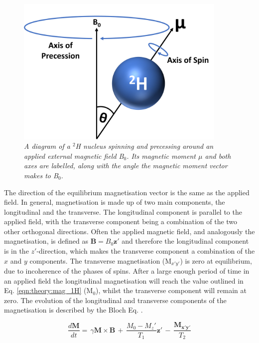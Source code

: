 \begin{figure}
    \centering
    \includegraphics[width=0.9\textwidth]{Figures/Theory/Moment.png}
    \caption{\textit{A diagram of a $^2$H nucleus spinning and precessing around an applied external magnetic field B$_0$. Its magnetic moment $\mu$ and both axes are labelled, along with the angle the magnetic moment vector makes to B$_0$.}}
    \label{fig:theory:moment}
\end{figure}

The direction of the equilibrium magnetisation vector is the same as the applied field. In general, magnetisation is made up of two main components, the longitudinal and the transverse. The longitudinal component is parallel to the applied field, with the transverse component being a combination of the two other orthogonal directions. Often the applied magnetic field, and analogously the magnetisation, is defined as $\mathbf{B}=B_0\mathbf{z'}$ and therefore the longitudinal component is in the $z'$-direction, which makes the transverse component a combination of the $x$ and $y$ components. The transverse magnetisation (M$_{x'y'}$) is zero at equilibrium, due to incoherence of the phases of spins. After a large enough period of time in an applied field the longitudinal magnetisation will reach the value outlined in Eq. \ref{eqn:theory:mag_1H} (M$_0$), whilst the transverse component will remain at zero. The evolution of the longitudinal and transverse components of the magnetisation is described by the Bloch Eq. \cite{Bloch1946NuclearInduction}.

\begin{equation}
    \frac{d\mathbf{M}}{dt} = \, \gamma\mathbf{M} \times \mathbf{B} \, + \, \frac{M_0-M_z'}{T_1}\mathbf{z'} \, - \, \frac{\mathbf{M_{x'y'}}}{T_2}
    \label{eqn:theory:Bloch}
\end{equation}

